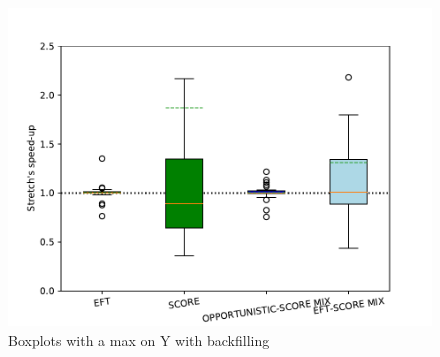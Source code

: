 \documentclass[conference,10pt]{IEEEtran}
\begin{document}
\begin{figure}\centering\includegraphics[width=1\linewidth]{../MBSS/plot/Boxplot/box_plot_mean_stretch_all_workloads_bf.pdf}\caption{Boxplots with a max on Y with backfilling}\end{figure}
\end{document}
